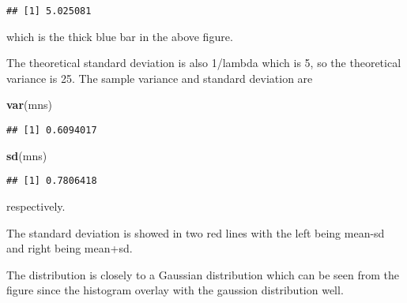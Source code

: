 \documentclass[
]{article}
\newenvironment{Shaded}{\begin{snugshade}}{\end{snugshade}}
\newcommand{\KeywordTok}[1]{\textcolor[rgb]{0.13,0.29,0.53}{\textbf{#1}}}
\newcommand{\NormalTok}[1]{#1}
\begin{document}
\begin{verbatim}
## [1] 5.025081
\end{verbatim}

which is the thick blue bar in the above figure.

The theoretical standard deviation is also 1/lambda which is 5, so the
theoretical variance is 25. The sample variance and standard deviation
are

\begin{Shaded}
\begin{Highlighting}[]
  \KeywordTok{var}\NormalTok{(mns)}
\end{Highlighting}
\end{Shaded}

\begin{verbatim}
## [1] 0.6094017
\end{verbatim}

\begin{Shaded}
\begin{Highlighting}[]
  \KeywordTok{sd}\NormalTok{(mns)}
\end{Highlighting}
\end{Shaded}

\begin{verbatim}
## [1] 0.7806418
\end{verbatim}

respectively.

The standard deviation is showed in two red lines with the left being
mean-sd and right being mean+sd.

The distribution is closely to a Gaussian distribution which can be seen
from the figure since the histogram overlay with the gaussion
distribution well.
\end{document}
